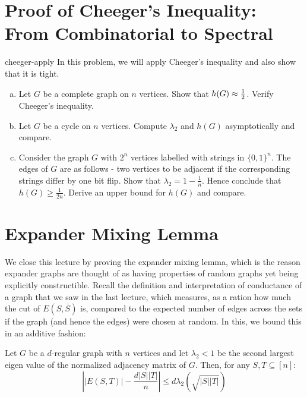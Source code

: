 \section{Proof of Cheeger's Inequality: From Combinatorial to Spectral}


\begin{exercise-prob}
\begin{show-ps3}{cheeger-apply}
In this problem, we will apply Cheeger's inequality and also show that it is tight.
\begin{enumerate}[(a)]
\item Let $G$ be a complete graph on $n$ vertices. Show that $h(G) \approx \frac{1}{2}$. Verify Cheeger's inequality.
\item Let $G$ be a cycle on $n$ vertices. Compute $\lambda_2$ and $h(G)$ asymptotically and compare.
\item Consider the graph $G$ with $2^n$ vertices labelled with strings in $\{0,1\}^n$. The edges of $G$ are as follows - two vertices to be adjacent if the corresponding strings differ by one bit flip. Show that $\lambda_2 = 1 - \frac{1}{n}$. Hence conclude that $h(G) \ge \frac{1}{2n}$. Derive an upper bound for $h(G)$ and compare.

\end{enumerate}

\end{show-ps3}
\end{exercise-prob}

\section{Expander Mixing Lemma}
We close this lecture by proving the expander mixing lemma, which is the reason expander graphs are thought of as having properties of random graphs yet being explicitly constructible. Recall the definition and interpretation of conductance of a graph that we saw in the last lecture, which measures, as a ration how much the cut of $E(S,\overline{S})$ is, compared to the expected number of edges across the sets if the graph (and hence the edges) were chosen at random. In this, we bound this in an additive fashion:

\begin{lemma}
\label{lem:expander-mixing-lemma} 
Let $G$ be a $d$-regular graph with $n$ vertices and let $\lambda_2<1$ be the second largest eigen value of the normalized adjacency matrix of $G$. Then, for any $S, T \subseteq [n]$:
$$\left||E(S,T)|-\frac{d|S||T|}{n}\right| \le d\lambda_2 \left(\sqrt{|S||T|}\right)$$
\end{lemma}

